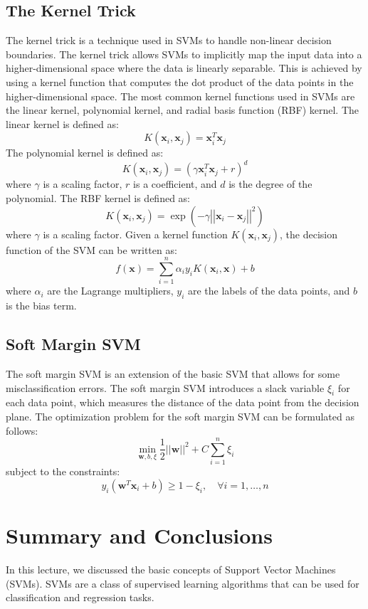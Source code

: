 \documentclass{article}[12pt]
\newcommand{\norm}[1]{\left|\left|#1\right|\right|}
\begin{document}
\subsection{The Kernel Trick}
The kernel trick is a technique used in SVMs to handle non-linear decision boundaries.
The kernel trick allows SVMs to implicitly map the input data into a higher-dimensional space where the data is linearly separable.
This is achieved by using a kernel function that computes the dot product of the data points in the higher-dimensional space.
The most common kernel functions used in SVMs are the linear kernel, polynomial kernel, and radial basis function (RBF) kernel.
The linear kernel is defined as:
\begin{equation}
K(\mathbf{x}_i, \mathbf{x}_j) = \mathbf{x}_i^T\mathbf{x}_j
\end{equation}
The polynomial kernel is defined as:
\begin{equation}
K(\mathbf{x}_i, \mathbf{x}_j) = (\gamma \mathbf{x}_i^T\mathbf{x}_j + r)^d
\end{equation}
where $\gamma$ is a scaling factor, $r$ is a coefficient, and $d$ is the degree of the polynomial.
The RBF kernel is defined as:
\begin{equation}
K(\mathbf{x}_i, \mathbf{x}_j) = \exp(-\gamma \norm{\mathbf{x}_i - \mathbf{x}_j}^2)
\end{equation}
where $\gamma$ is a scaling factor. Given a kernel function $K(\mathbf{x}_i, \mathbf{x}_j)$, the decision function of the SVM can be written as:
\begin{equation}
f(\mathbf{x}) = \sum_{i=1}^{n} \alpha_i y_i K(\mathbf{x}_i, \mathbf{x}) + b
\end{equation}
where $\alpha_i$ are the Lagrange multipliers, $y_i$ are the labels of the data points, and $b$ is the bias term.

\subsection{Soft Margin SVM}
The soft margin SVM is an extension of the basic SVM that allows for some misclassification errors.
The soft margin SVM introduces a slack variable $\xi_i$ for each data point, which measures the distance of the data point from the decision plane.
The optimization problem for the soft margin SVM can be formulated as follows:
\begin{equation}
\min_{\mathbf{w},b,\xi} \frac{1}{2} \norm{\mathbf{w}}^2 + C\sum_{i=1}^{n} \xi_i
\end{equation}
subject to the constraints:
\begin{equation}
y_i(\mathbf{w}^T\mathbf{x}_i + b) \geq 1 - \xi_i, \quad \forall i = 1, \ldots, n
\end{equation}

\section{Summary and Conclusions}
In this lecture, we discussed the basic concepts of Support Vector Machines (SVMs). 
SVMs are a class of supervised learning algorithms that can be used for classification and regression tasks.



\end{document}
